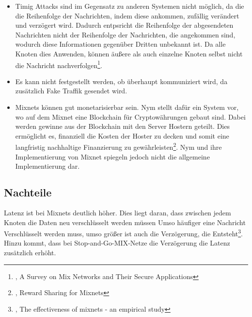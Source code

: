 \begin{itemize}
    \item Timig Attacks sind im Gegensatz zu anderen Systemen nicht möglich, da die die Reihenfolge der Nachrichten, indem diese ankommen, zufällig verändert und verzögert wird. Dadurch entpsricht die Reihenfolge der abgesendeten Nachrichten nicht der Reihenfolge der Nachrichten, die angekommen sind, wodurch diese Informationen gegenüber Dritten unbekannt ist. Da alle Knoten dies Anwenden, können äußere als auch einzelne Knoten selbst nicht die Nachricht nachverfolgen\footnote{\cite{MixNetworksSecureApplications}, A Survey on Mix Networks and Their Secure Applications}.
    \item Es kann nicht festgestellt werden, ob überhaupt kommuniziert wird, da zusätzlich Fake Traffik gesendet wird.
    \item Mixnets können gut monetarisierbar sein. Nym stellt dafür ein System vor, wo auf dem Mixnet eine Blockchain für Cryptowährungen gebaut sind. Dabei werden gewinne aus der Blockchain mit den Server Hostern geteilt. Dies ermöglicht es, finanziell die Kosten der Hoster zu decken und somit eine langfristig nachhaltige Finanzierung zu gewährleisten\footnote{\cite{RewardSharingForMixnets}, Reward Sharing for Mixnets}. Nym und ihre Implementierung von Mixnet spiegeln jedoch nicht die allgemeine Implementierung dar.
\end{itemize}

\subsection{Nachteile}

Latenz ist bei Mixnets deutlich höher. Dies liegt daran, dass zwischen jedem Knoten die Daten neu verschlüsselt werden müssen Umso häufiger eine Nachricht Verschlüsselt werden muss, umso größer ist auch die Verzögerung, die Entsteht\footnote{\cite{EffectivenessOfMixnets}, The effectiveness of mixnets - an empirical study}. Hinzu kommt, dass bei Stop-and-Go-MIX-Netze die Verzögerung die Latenz zusätzlich erhöht.
